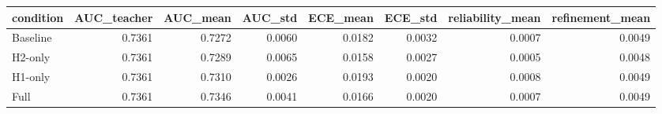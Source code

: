 \begin{tabular}{lrrrrrrr}
\toprule
condition & AUC_teacher & AUC_mean & AUC_std & ECE_mean & ECE_std & reliability_mean & refinement_mean \\
\midrule
Baseline & 0.7361 & 0.7272 & 0.0060 & 0.0182 & 0.0032 & 0.0007 & 0.0049 \\
H2-only & 0.7361 & 0.7289 & 0.0065 & 0.0158 & 0.0027 & 0.0005 & 0.0048 \\
H1-only & 0.7361 & 0.7310 & 0.0026 & 0.0193 & 0.0020 & 0.0008 & 0.0049 \\
Full & 0.7361 & 0.7346 & 0.0041 & 0.0166 & 0.0020 & 0.0007 & 0.0049 \\
\bottomrule
\end{tabular}
